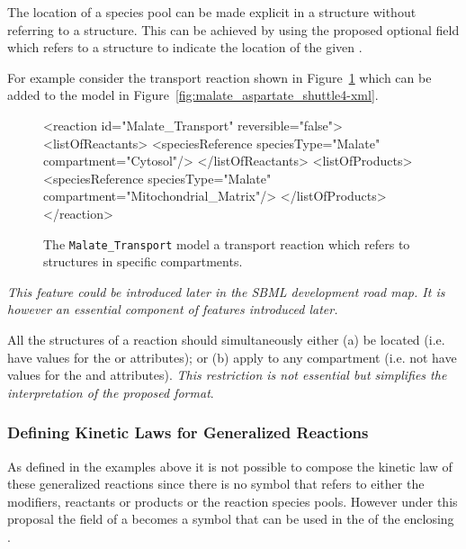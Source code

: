 \documentclass{cekarticle}
\begin{document}
The location of a species pool can be made explicit in a  structure
without referring to a  structure.  This can be achieved by using the proposed optional
 field which refers to a  structure to indicate the 
location of the given .

For example consider the transport reaction shown in Figure~\ref{fig:Malate_Transport-xml}
which can be added to the model in Figure~\ref{fig:malate_aspartate_shuttle4-xml}.

\begin{figure}[h]
\begin{example}
<reaction id="Malate_Transport" reversible="false">
    <listOfReactants>
        <speciesReference speciesType="Malate" compartment="Cytosol"/>
    </listOfReactants>
    <listOfProducts>
        <speciesReference speciesType="Malate" compartment="Mitochondrial_Matrix"/>
    </listOfProducts>
</reaction>
\end{example}
\caption{The \texttt{Malate\_Transport} model a transport reaction which refers to 
structures in specific compartments.} 
\label{fig:Malate_Transport-xml}
\end{figure}


\emph{This feature could be introduced later in the SBML development road map.
It is however an essential component of features introduced later.}

All the  structures of a reaction should simultaneously either
(a) be located (i.e. have values for the  or  attributes);
or (b) apply to any compartment (i.e. not have values for the  and 
attributes). \emph{This restriction is not essential but simplifies the interpretation of
the proposed format}.

\subsubsection{Defining Kinetic Laws for Generalized Reactions}

As defined in the examples above it is not possible to compose the kinetic law of these generalized
reactions since there is no symbol that refers to either the modifiers, reactants or products or the
reaction species pools.  However under this proposal the  field of a
 becomes a symbol that can be used in the  of the 
enclosing .
\end{document}
